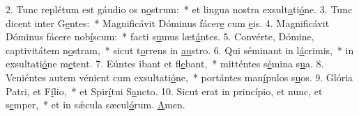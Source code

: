 2. Tunc replétum est gáudio os n\uline{o}strum:~* et lingua nostra exsult\uline{a}ti\uline{ó}ne.
3. Tunc dicent inter G\uline{e}ntes:~* Magnificávit Dóminus fácer\uline{e} cum \uline{e}is.
4. Magnificávit Dóminus fácere nob\uline{í}scum:~* facti s\uline{u}mus læt\uline{á}ntes.
5. Convérte, Dómine, captivitátem n\uline{o}stram,~* sicut t\uline{o}rrens in \uline{au}stro.
6. Qui séminant in l\uline{á}crimis,~* in exsultati\uline{ó}ne m\uline{e}tent.
7. Eúntes ibant et fl\uline{e}bant,~* mitténtes s\uline{é}mina s\uline{u}a.
8. Veniéntes autem vénient cum exsultati\uline{ó}ne,~* portántes man\uline{í}pulos s\uline{u}os.
9. Glória Patri, et F\uline{í}lio,~* et Spir\uline{í}tui S\uline{a}ncto.
10. Sicut erat in princípio, et nunc, et s\uline{e}mper,~* et in sǽcula sæcul\uline{ó}rum. \uline{A}men.
